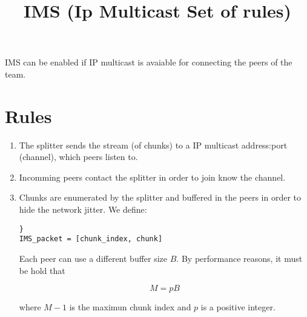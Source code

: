 \documentclass{article}
\title{IMS (Ip Multicast Set of rules)}
\begin{document}
\maketitle

IMS can be enabled if IP multicast is avaiable for connecting the
peers of the team.

\section{Rules}

\begin{enumerate}
\item The splitter sends the stream (of chunks) to a IP multicast
  address:port (channel), which peers listen to.

\item Incomming peers contact the splitter in order to join know the
  channel.

\item Chunks are enumerated by the splitter and buffered in the peers
  in order to hide the network jitter. We define:

\begin{verbatim}}
IMS_packet = [chunk_index, chunk]
\end{verbatim}

   Each peer can use a different buffer size $B$. By performance
   reasons, it must be hold that
   
   \begin{equation}
     M = pB
   \label{eq:chunk_index_buffer_size_relation}
   \end{equation}

   where $M-1$ is the maximun chunk index and $p$ is a positive integer.
\end{enumerate}
\end{document}
